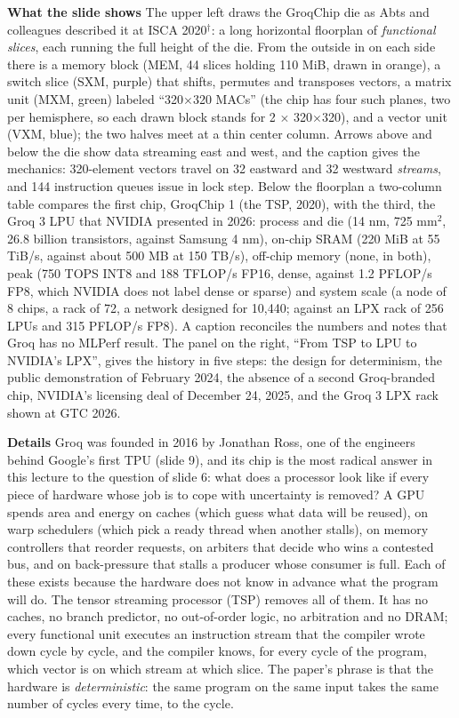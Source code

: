 \documentclass[11pt,letterpaper]{article}
\newcommand{\para}[1]{\medskip\noindent\textbf{#1}\quad}
\begin{document}
\para{What the slide shows} The upper left draws the GroqChip die as Abts and colleagues described it at ISCA 2020$^\dagger$: a long horizontal floorplan of \emph{functional slices}, each running the full height of the die. From the outside in on each side there is a memory block (MEM, 44 slices holding 110 MiB, drawn in orange), a switch slice (SXM, purple) that shifts, permutes and transposes vectors, a matrix unit (MXM, green) labeled ``320$\times$320 MACs'' (the chip has four such planes, two per hemisphere, so each drawn block stands for 2 $\times$ 320$\times$320), and a vector unit (VXM, blue); the two halves meet at a thin center column. Arrows above and below the die show data streaming east and west, and the caption gives the mechanics: 320-element vectors travel on 32 eastward and 32 westward \emph{streams}, and 144 instruction queues issue in lock step. Below the floorplan a two-column table compares the first chip, GroqChip 1 (the TSP, 2020), with the third, the Groq 3 LPU that NVIDIA presented in 2026: process and die (14 nm, 725 mm$^2$, 26.8 billion transistors, against Samsung 4 nm), on-chip SRAM (220 MiB at 55 TiB/s, against about 500 MB at 150 TB/s), off-chip memory (none, in both), peak (750 TOPS INT8 and 188 TFLOP/s FP16, dense, against 1.2 PFLOP/s FP8, which NVIDIA does not label dense or sparse) and system scale (a node of 8 chips, a rack of 72, a network designed for 10{,}440; against an LPX rack of 256 LPUs and 315 PFLOP/s FP8). A caption reconciles the numbers and notes that Groq has no MLPerf result. The panel on the right, ``From TSP to LPU to NVIDIA's LPX'', gives the history in five steps: the design for determinism, the public demonstration of February 2024, the absence of a second Groq-branded chip, NVIDIA's licensing deal of December 24, 2025, and the Groq 3 LPX rack shown at GTC 2026.

\para{Details} Groq was founded in 2016 by Jonathan Ross, one of the engineers behind Google's first TPU (slide 9), and its chip is the most radical answer in this lecture to the question of slide 6: what does a processor look like if every piece of hardware whose job is to cope with uncertainty is removed? A GPU spends area and energy on caches (which guess what data will be reused), on warp schedulers (which pick a ready thread when another stalls), on memory controllers that reorder requests, on arbiters that decide who wins a contested bus, and on back-pressure that stalls a producer whose consumer is full. Each of these exists because the hardware does not know in advance what the program will do. The tensor streaming processor (TSP) removes all of them. It has no caches, no branch predictor, no out-of-order logic, no arbitration and no DRAM; every functional unit executes an instruction stream that the compiler wrote down cycle by cycle, and the compiler knows, for every cycle of the program, which vector is on which stream at which slice. The paper's phrase is that the hardware is \emph{deterministic}: the same program on the same input takes the same number of cycles every time, to the cycle.
\end{document}
